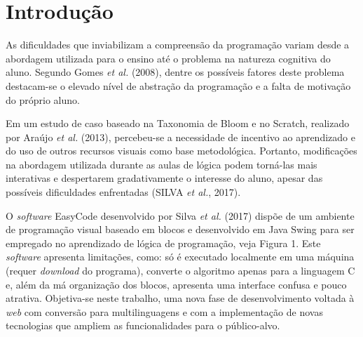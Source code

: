 \documentclass[12pt]{article}
\begin{document}
\section{Introdução} 
As dificuldades que inviabilizam a compreensão da programação variam desde a abordagem utilizada para o ensino até o problema na natureza cognitiva do aluno. Segundo Gomes \textit{et al.} (2008), dentre os possíveis fatores deste problema destacam-se o elevado nível de abstração da programação e a falta de motivação do próprio aluno. 
\par Em um estudo de caso baseado na Taxonomia de Bloom e no Scratch, realizado por Araújo \textit{et al.} (2013), percebeu-se a necessidade de incentivo ao aprendizado e do uso de outros recursos visuais como base metodológica. Portanto, modificações na abordagem utilizada durante as aulas de lógica podem torná-las mais interativas e despertarem gradativamente o interesse do aluno, apesar das possíveis dificuldades enfrentadas (SILVA \textit{et al.}, 2017).
\par O \textit{software} EasyCode desenvolvido por Silva \textit{et al.} (2017) \cite{SILVA:2017} dispõe de um ambiente de programação visual baseado em blocos e desenvolvido em Java Swing para ser empregado no aprendizado de lógica de programação, veja Figura 1. Este \textit{software} apresenta limitações, como: só é executado localmente em uma máquina (requer \textit{download} do programa), converte o algoritmo apenas para a linguagem C e, além da má organização dos blocos, apresenta uma interface confusa e pouco atrativa. Objetiva-se neste trabalho, uma nova fase de desenvolvimento voltada à \textit{web} com conversão para multilinguagens e com a implementação de novas tecnologias que ampliem as funcionalidades para o público-alvo.
\end{document}
